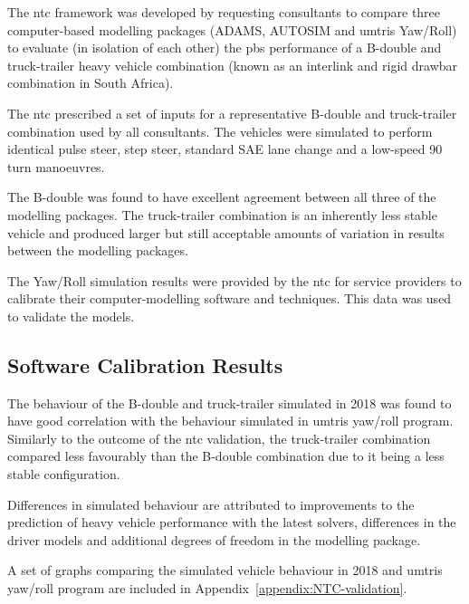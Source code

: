 The \gls{ntc} framework was developed by requesting consultants to compare three computer-based modelling packages (ADAMS, AUTOSIM and \glspl{umtri} Yaw/Roll) to evaluate (in isolation of each other) the \gls{pbs} performance of a B-double and truck-trailer heavy vehicle combination \cite{Prem2001} (known as an interlink and rigid drawbar combination in South Africa).

The \gls{ntc} prescribed a set of inputs for a representative B-double and truck-trailer combination used by all consultants. The vehicles were simulated to perform identical pulse steer, step steer, standard SAE lane change and a low-speed 90\degree{} turn manoeuvres.

The B-double was found to have excellent agreement between all three of the modelling packages. The truck-trailer combination is an inherently less stable vehicle and produced larger but still acceptable amounts of variation in results between the modelling packages.

The Yaw/Roll simulation results were provided by the \gls{ntc} for service providers to calibrate their computer-modelling software and techniques. This data was used to validate the models.

\subsection{Software Calibration Results}\label{section:validation-results}

The behaviour of the B-double and truck-trailer simulated in \trucksim{} 2018 was found to have good correlation with the behaviour simulated in \glspl{umtri} yaw/roll program. Similarly to the outcome of the \gls{ntc} validation, the truck-trailer combination compared less favourably than the B-double combination due to it being a less stable configuration.

Differences in simulated behaviour are attributed to improvements to the prediction of heavy vehicle performance with the latest solvers, differences in the driver models and additional degrees of freedom in the \trucksim{} modelling package.

A set of graphs comparing the simulated vehicle behaviour in \trucksim{} 2018 and \glspl{umtri} yaw/roll program are included in Appendix~\ref{appendix:NTC-validation}.